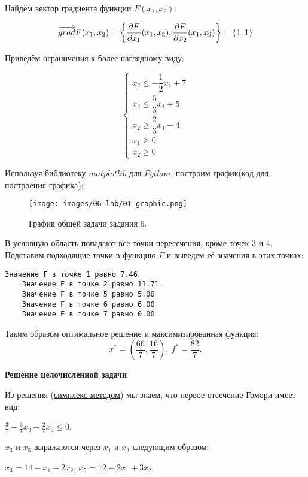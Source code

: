 Найдём вектор градиента функции $F(x_1, x_2)$:

\[
    \overrightarrow{grad}F(x_1, x_2) = \left\{\frac{\partial F}{\partial x_1}(x_1, x_2), \frac{\partial F}{\partial x_2}(x_1, x_2)\right\} = \left\{1, 1\right\}
\]

Приведём ограничения к более наглядному виду:

\[
    \begin{cases}
        x_2 \leq -\dfrac{1}{2}x_1 + 7 \\
        x_2 \leq \dfrac{5}{3}x_1 + 5  \\
        x_2 \geq \dfrac{2}{3}x_1 - 4  \\
        x_1 \geq 0                    \\
        x_2 \geq 0
    \end{cases}
\]

Используя библиотеку $matplotlib$ для $Python$, построим график(\href{https://github.com/retrobannerS/optimization_methods/blob/main/python/06-lab/01-graphic.py}{код для построения графика}):

\begin{figure}[H]
    \leftskip-1.5cm
    \texttt{[image: images/06-lab/01-graphic.png]}
    \caption{График общей задачи задания 6.}
    \label{06-lab-01-graphic}
\end{figure}

В условную область попадают все точки пересечения, кроме точек 3 и 4.
Подставим подходящие точки в функцию $F$ и выведем её значения в этих точках:

\begin{lstlisting}[language=text]
    Значение F в точке 1 равно 7.46
    Значение F в точке 2 равно 11.71
    Значение F в точке 5 равно 5.00
    Значение F в точке 6 равно 6.00
    Значение F в точке 7 равно 0.00
\end{lstlisting}

Таким образом оптимальное решение и максимизированная функция:
\[x^* = \left(\dfrac{66}{7}, \dfrac{16}{7}\right),\ f^* = \dfrac{82}{7}.\]

\textbf{Решение целочисленной задачи}

Из решения (\hyperref[06-lab-solution-simplex]{симплекс-методом}) мы знаем, что первое отсечение Гомори имеет вид:

$ \frac{ 3}{ 7} - \frac{ 3}{ 7}x_3 - \frac{ 2}{ 7}x_5 \leq 0 $.

$x_3$ и $x_5$ выражаются через $x_1$ и $x_2$ следующим образом:

$x_3 = 14 - x_1 - 2x_2$, $x_5 = 12 -2x_1 + 3x_2$.

